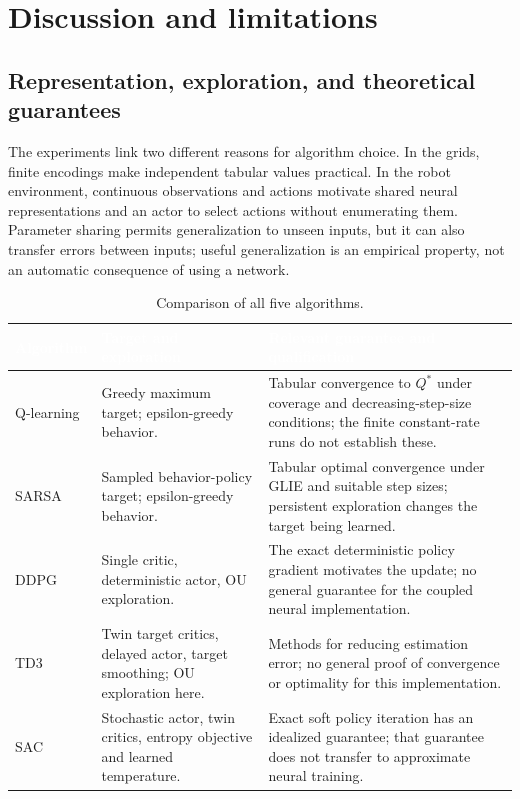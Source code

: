 \documentclass[11pt,a4paper]{article}
\theoremstyle{definition}
\theoremstyle{plain}
\theoremstyle{remark}
\newcommand{\thcell}[1]{\textcolor{white}{\textbf{#1}}}
\begin{document}
\FloatBarrier

\section{Discussion and limitations}
\label{sec:limits}

\subsection{Representation, exploration, and theoretical guarantees}

The experiments link two different reasons for algorithm choice. In the grids, finite encodings make independent tabular values practical. In the robot environment, continuous observations and actions motivate shared neural representations and an actor to select actions without enumerating them. Parameter sharing permits generalization to unseen inputs, but it can also transfer errors between inputs; useful generalization is an empirical property, not an automatic consequence of using a network.

\begin{table}[h!]
\centering\small
\begin{tabularx}{\linewidth}{@{}p{1.8cm}YY@{}}
\toprule
{}\thcell{Algorithm}&\thcell{Target and exploration}&\thcell{Relevant guarantee and qualification}\\
\midrule
Q-learning&Greedy maximum target; epsilon-greedy behavior.&Tabular convergence to $Q^*$ under coverage and decreasing-step-size conditions; the finite constant-rate runs do not establish these.\\
 SARSA&Sampled behavior-policy target; epsilon-greedy behavior.&Tabular optimal convergence under GLIE and suitable step sizes; persistent exploration changes the target being learned.\\
DDPG&Single critic, deterministic actor, OU exploration.&The exact deterministic policy gradient motivates the update; no general guarantee for the coupled neural implementation.\\
 TD3&Twin target critics, delayed actor, target smoothing; OU exploration here.&Methods for reducing estimation error; no general proof of convergence or optimality for this implementation.\\
SAC&Stochastic actor, twin critics, entropy objective and learned temperature.&Exact soft policy iteration has an idealized guarantee; that guarantee does not transfer to approximate neural training.\\
\bottomrule
\end{tabularx}
\caption{Comparison of all five algorithms.}
\label{tab:algorithm-summary}
\end{table}
\end{document}
